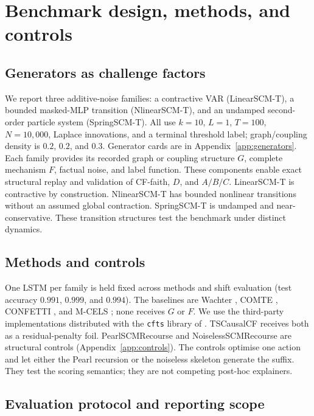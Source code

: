 \documentclass{article}
\begin{document}
\section{Benchmark design, methods, and controls}
\label{sec:setup}

\subsection{Generators as challenge factors}
\label{sec:setup-generators}

We report three additive-noise families: a contractive VAR (LinearSCM-T), a bounded masked-MLP transition (NlinearSCM-T), and an undamped second-order particle system (SpringSCM-T).  All use $k=10$, $L=1$, $T=100$, $N=10{,}000$, Laplace innovations, and a terminal threshold label; graph/coupling density is $0.2$, $0.2$, and $0.3$.  Generator cards are in Appendix~\ref{app:generators}. Each family provides its recorded graph or coupling structure $G$, complete mechanism $F$, factual noise, and label function. These components enable exact structural replay and validation of CF-faith, $D$, and $A/B/C$. LinearSCM-T is contractive by construction. NlinearSCM-T has bounded nonlinear transitions without an assumed global contraction. SpringSCM-T is undamped and near-conservative. These transition structures test the benchmark under distinct dynamics.

\subsection{Methods and controls}
\label{sec:setup-methods}

One LSTM per family is held fixed across methods and shift evaluation (test accuracy $0.991$, $0.999$, and $0.994$).  The baselines are Wachter \citep{wachter2017counterfactual}, COMTE \citep{ates2021comte}, CONFETTI \citep{paredescetina2025confetti}, and M-CELS \citep{li2024mcels}; none receives $G$ or $F$.  We use the third-party implementations distributed with the \texttt{cfts} library of \citet{schlegel2026whatif}.  TSCausalCF \citep{bahri2025causalfeasibility} receives both as a residual-penalty foil.  PearlSCMRecourse and NoiselessSCMRecourse are structural controls (Appendix~\ref{app:controls}). The controls optimise one action and let either the Pearl recursion or the noiseless skeleton generate the suffix.  They test the scoring semantics; they are not competing post-hoc explainers.

\subsection{Evaluation protocol and reporting scope}
\label{sec:setup-protocol}
\end{document}
